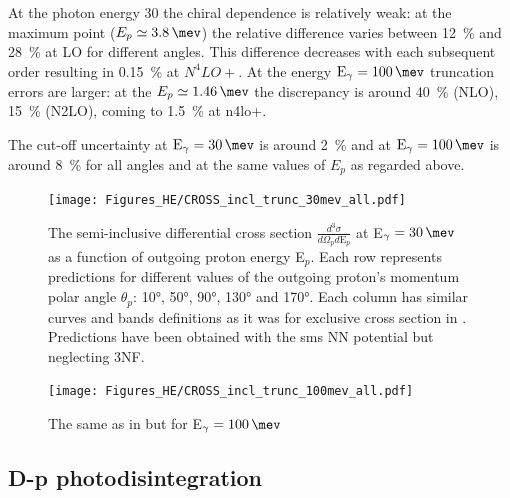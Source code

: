         At the photon energy \SI{30}{\mev} the chiral dependence is relatively weak: at the maximum point
        ($E_p \simeq \SI{3.8}{\mev}$) the relative difference varies between \SI{12}{\percent} and 
        \SI{28}{\percent} at LO for different angles. This difference decreases with each subsequent order
        resulting in \SI{0.15}{\percent} at $N^4LO+$. At the energy $\text{E}_\gamma = \SI{100}{\mev}$ truncation errors
        are larger: at the $E_p \simeq \SI{1.46}{\mev}$ the discrepancy is around \SI{40}{\percent} (NLO),
        \SI{15}{\percent} (N2LO), coming to \SI{1.5}{\percent} at \gls{n4lo+}.

        The cut-off uncertainty at $\text{E}_\gamma = \SI{30}{\mev}$ is around \SI{2}{\percent}
        and at $\text{E}_\gamma = \SI{100}{\mev}$ is around \SI{8}{\percent} for all angles and 
        at the same values of $E_p$ as regarded above.


        \begin{figure}[h]
            \begin{center}
            \texttt{[image: Figures\_HE/CROSS\_incl\_trunc\_30mev\_all.pdf]}
            \end{center}
            \caption{The semi-inclusive differential cross section $\frac{d^3\sigma}{d\Omega_p d\text{E}_p}$
            at E$_\gamma = \SI{30}{\mev}$ as a function of outgoing proton energy E$_p$. Each row represents 
            predictions for different values of the outgoing proton's momentum polar angle $\theta_p$: 
            \ang{10}, \ang{50}, \ang{90}, \ang{130} and \ang{170}. Each column has similar 
            curves and bands definitions as it was for exclusive cross section in .  
            Predictions have been obtained with the \gls{sms} NN potential but neglecting 3NF.}
            \label{CROSS_HE_INCL_30MEV_2NF}
        \end{figure}

        \begin{figure}[h]
            \begin{center}
            \texttt{[image: Figures\_HE/CROSS\_incl\_trunc\_100mev\_all.pdf]}
            \end{center}
            \caption{The same as in  but for E$_\gamma = \SI{100}{\mev}$}
            \label{CROSS_HE_INCL_100MEV_2NF}
        \end{figure}


\clearpage


\subsection{D-p photodisintegration}

